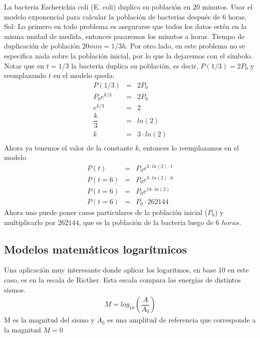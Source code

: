 \begin{myexample}
La bacteria Escherichia coli (E. coli) duplica su población en 20 minutos. Usar el modelo exponencial para calcular la población de bacterias después de 6 horas.\\

\noindent Sol: Lo primero en todo problema es asegurarse que todos los datos estén en la misma unidad de medida, entonces pasaremos los minutos a horas. Tiempo de duplicación de población $20min=1/3h$. Por otro lado, en este problema no se especifica nada sobre la población inicial, por lo que la dejaremos con el símbolo.\\

Notar que en $t=1/3$ la bacteria duplica su población, es decir, $P(1/3)=2P_{0}$ y reemplazando $t$ en el modelo queda:
\begin{eqnarray*}
P(1/3)&=&  2P_{0}\\
P_{0}e^{k/3}&=&2P_{0}\\
e^{k/3}&=&2\\
\dfrac{k}{3}&=&ln(2)\\
k&=&3\cdot ln(2)\\
\end{eqnarray*}
Ahora ya tenemos el valor de la constante $k$, entonces lo reemplazamos en el modelo
\begin{eqnarray*}
P(t)&=&P_{0}e^{3\cdot ln(2)\cdot t}\\
P(t=6)&=&P_{0}e^{3\cdot ln(2)\cdot 6}\\
P(t=6)&=&P_{0}e^{18\cdot ln(2) }\\
P(t=6)&=&P_{0}\cdot 262144
\end{eqnarray*}
Ahora uno puede poner casos particulares de la población inicial ($P_{0}$) y multiplicarlo por $262144$, que es la población de la bacteria luego de $6$ $horas$.
\end{myexample}

\subsection{Modelos matemáticos logarítmicos}

Una aplicación muy interesante donde aplicar los logaritmos, en base 10 en este caso, es en la escala de Ricther. Esta escala compara las energías de distintos sismos. 
\begin{eqnarray}
M=log_{10}\left(\dfrac{A}{A_{0}}\right)
\end{eqnarray}
M es la magnitud del sismo y $A_{0}$ es una amplitud de referencia que corresponde a la magnitud $M=0$


